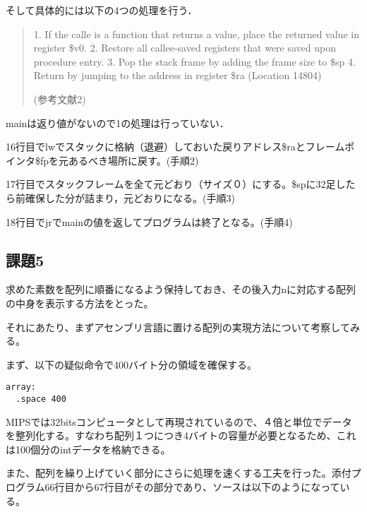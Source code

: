 \documentclass[a4j]{jarticle}
\begin{document}
そして具体的には以下の4つの処理を行う．

\begin{quote}
1. If the calle is a function that returns a value, place the returned value in register \$v0.
2. Restore all callee-saved registers that were saved upon procedure entry.
3. Pop the stack frame by adding the frame size to \$sp
4. Return by jumping to the address in register \$ra
(Location 14804)

(参考文献2)
\end{quote}


mainは返り値がないので1の処理は行っていない．

16行目でlwでスタックに格納（退避）しておいた戻りアドレス\$raとフレームポインタ\$fpを元あるべき場所に戻す。(手順2)

17行目でスタックフレームを全て元どおり（サイズ０）にする。\$spに32足したら前確保した分が詰まり，元どおりになる。(手順3)

18行目でjrでmainの値を返してプログラムは終了となる。(手順4)



\subsection{課題5}



求めた素数を配列に順番になるよう保持しておき、その後入力nに対応する配列の中身を表示する方法をとった。

それにあたり、まずアセンブリ言語に置ける配列の実現方法について考察してみる。

まず、以下の疑似命令で400バイト分の領域を確保する。\\



\begin{lstlisting}
array:
  .space 400
\end{lstlisting}


MIPSでは32bitsコンピュータとして再現されているので、４倍と単位でデータを整列化する。すなわち配列１つにつき4バイトの容量が必要となるため、これは100個分のintデータを格納できる。

また、配列を繰り上げていく部分にさらに処理を速くする工夫を行った。添付プログラム66行目から67行目がその部分であり、ソースは以下のようになっている。\\
\end{document}
